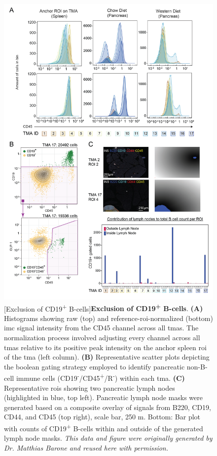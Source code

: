

\begin{figure}[H]
    \centering
    \includegraphics[width=14cm]{Appendix2/Fig/F2-A2-01.png}
    [Exclusion of CD19\textsuperscript{+} B-cells]{\textbf{Exclusion of CD19\textsuperscript{+} B-cells}. \textbf{(A)} Histograms showing raw (top) and reference-\gls{roi}-normalized (bottom) \gls{imc} signal intensity from the CD45 channel across all \glspl{tma}. The normalization process involved adjusting every channel across all \glspl{tma} relative to its positive peak intensity on the anchor spleen \gls{roi} of the \gls{tma} (left column). \textbf{(B)} Representative scatter plots depicting the boolean gating strategy employed to identify pancreatic non-B-cell immune cells (CD19\textsuperscript{-}/CD45\textsuperscript{+}/R\textsuperscript{-}) within each \gls{tma}. \textbf{(C)} Representative \glspl{roi} showing two pancreatic lymph nodes (highlighted in blue, top left). Pancreatic lymph node masks were generated based on a composite overlay of signals from  B220, CD19, CD44, and CD45 (top right), scale bar, 250 \textmu m. Bottom: Bar plot with counts of CD19\textsuperscript{+} B-cells within and outside of the generated lymph node masks. \textit{This data and figure were originally generated by Dr. Matthias Barone and reused here with permission.}}

\end{figure}
